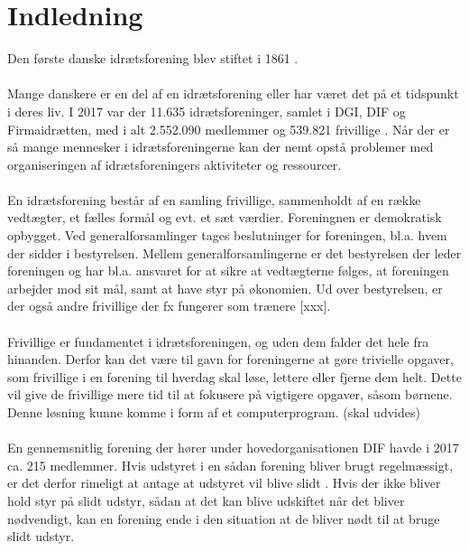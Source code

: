 \chapter{Indledning}\label{ch:introduction}
Den første danske idrætsforening blev stiftet i 1861 \cite{difhistorie}.
\\
\\
Mange danskere er en del af en idrætsforening eller har været det på et tidspunkt i deres liv. I 2017 var der 11.635 idrætsforeninger, samlet i DGI, DIF og Firmaidrætten, med i alt 2.552.090 medlemmer og 539.821 frivillige \cite{fester2018}. Når der er så mange mennesker i idrætsforeningerne kan der nemt opstå problemer med organiseringen af idrætsforeningers aktiviteter og ressourcer. 
\\
\\
En idrætsforening består af en samling frivillige, sammenholdt af en række vedtægter, et fælles formål og evt. et sæt værdier. Foreningnen er demokratisk opbygget. Ved generalforsamlinger tages beslutninger for foreningen, bl.a. hvem der sidder i bestyrelsen. Mellem generalforsamlingerne er det bestyrelsen der leder foreningen og har bl.a. ansvaret for at sikre at vedtægterne følges, at foreningen arbejder mod sit mål, samt at have styr på økonomien. Ud over bestyrelsen, er der også andre frivillige der fx fungerer som trænere [xxx].
\\
\\
Frivillige er fundamentet i idrætsforeningen, og uden dem falder det hele fra hinanden. Derfor kan det være til gavn for foreningerne at gøre trivielle opgaver, som frivillige i en forening til hverdag skal løse, lettere eller fjerne dem helt. Dette vil give de frivillige mere tid til at fokusere på vigtigere opgaver, såsom børnene.
Denne løsning kunne komme i form af et computerprogram. (skal udvides)
\\
\\
En gennemsnitlig forening der hører under hovedorganisationen DIF havde i 2017 ca. 215 medlemmer. Hvis udstyret i en sådan forening bliver brugt regelmæssigt, er det derfor rimeligt at antage at udstyret vil blive slidt \citep{idrætTal2017}.
Hvis der ikke bliver hold styr på slidt udstyr, sådan at det kan blive udskiftet når det bliver nødvendigt, kan en forening ende i den situation at de bliver nødt til at bruge slidt udstyr.
